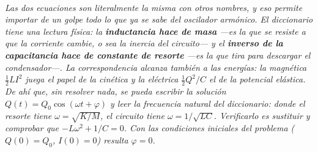\begin{center}
\begin{tikzpicture}[scale=1]
\end{tikzpicture}\\[0.5em]
{\small\itshape Las dos ecuaciones son literalmente la misma con otros nombres,
y eso permite importar de un golpe todo lo que ya se sabe del oscilador
armónico. El diccionario tiene una lectura física: la \textbf{inductancia hace
de masa} ---es la que se resiste a que la corriente cambie, o sea la inercia del
circuito--- y el \textbf{inverso de la capacitancia hace de constante de
resorte} ---es la que tira para descargar el condensador---. La correspondencia
alcanza también a las energías: la magnética $\tfrac12 LI^2$ juega el papel de
la cinética y la eléctrica $\tfrac12 Q^2/C$ el de la potencial elástica. De ahí
que, sin resolver nada, se pueda escribir la solución
$Q(t)=Q_0\cos(\omega t+\varphi)$ y leer la frecuencia natural del diccionario:
donde el resorte tiene $\omega=\sqrt{K/M}$, el circuito tiene
$\omega = 1/\sqrt{LC}$. Verificarlo es sustituir y comprobar que
$-L\omega^2 + 1/C = 0$. Con las condiciones iniciales del problema
($Q(0)=Q_0$, $I(0)=0$) resulta $\varphi=0$.}
\end{center}
